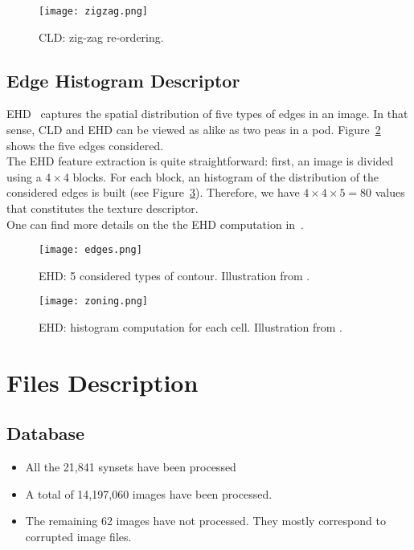 \documentclass[conference]{IEEEtran}
\begin{document}
\begin{figure}[!ht]
\center
	\texttt{[image: zigzag.png]}
	\caption{CLD: zig-zag re-ordering.}
	\label{fig:zigzag}
\end{figure}



\subsection{Edge Histogram Descriptor}
\label{sec:ehd}
EHD~\cite{ehd:2000} captures the spatial distribution of five types of edges in an image. In that sense, CLD and EHD can be viewed as alike as two peas in a pod. Figure~\ref{fig:edges} shows the five edges considered.\\

The EHD feature extraction is quite straightforward: first, an image is divided using a $4\times4$ blocks. For each block, an histogram of the distribution of the considered edges is built (see Figure~\ref{fig:zoning}). Therefore, we have $4\times4\times5=80$ values that constitutes the texture descriptor.\\

One can find more details on the the EHD computation in~\cite{Manjunath:2001}.
	
\begin{figure}[!ht]
\center
	\texttt{[image: edges.png]}
	\caption{EHD: 5 considered types of contour. Illustration from \cite{ehd:2002}.}
	\label{fig:edges}
\end{figure}

\begin{figure}[!ht]
\center
	\texttt{[image: zoning.png]}
	\caption{EHD: histogram computation for each cell. Illustration from \cite{ehd:2002}.}
	\label{fig:zoning}
\end{figure}

\section{Files Description}
\label{sec:data}

\subsection{Database}
\begin{itemize}
	\item All the 21,841 synsets have been processed
	\item A total of 14,197,060 images have been processed.
	\item The remaining 62 images have not processed. They  mostly correspond to corrupted image files.
\end{itemize}
\end{document}
